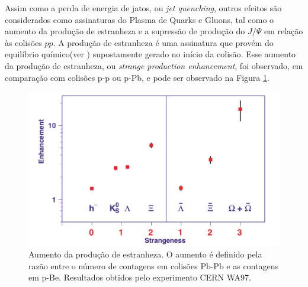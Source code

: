 Assim como a perda de energia de jatos, ou \emph{jet quenching}, outros efeitos são considerados como assinaturas do Plasma de Quarks e Gluons,
tal como o aumento da produção de estranheza e a supressão de produção do $J/\Psi$ em relação às colisões $pp$. A produção de estranheza é uma assinatura que provém do
equilíbrio químico(ver \cite{letessier_hadrons_2002}) supostamente gerado no início da colisão. Esse aumento da produção de estranheza, ou \emph{strange production enhancement},
foi observado, em comparação com colisões p-p ou p-Pb, e pode ser observado na Figura \ref{strangeness}.

\begin{figure}
 \centering
 \includegraphics[scale=.3]{Content/strangeness.png}
 \caption{Aumento da produção de estranheza. O aumento é definido pela razão entre o número de contagens em colisões Pb-Pb e as contagens em p-Be. Resultados obtidos pelo experimento
 CERN WA97.}
 \label{strangeness}
\end{figure}